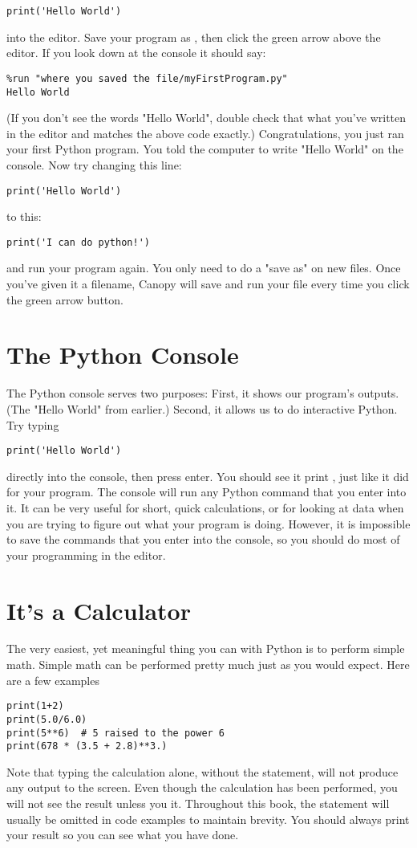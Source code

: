 \begin{Verbatim}
print('Hello World')
\end{Verbatim}

into the editor. Save your program as , then click the green
arrow above the editor. If you look down at the console it should say:

\begin{Verbatim}
%run "where you saved the file/myFirstProgram.py"
Hello World
\end{Verbatim}
(If you don't see the words "Hello World", double check that what you've written in the editor and matches the above code exactly.) Congratulations, you just ran your first Python program. You told the computer to write "Hello World" on the console.
Now try changing this line:
\begin{Verbatim}
print('Hello World')
\end{Verbatim}
to this:
\begin{Verbatim}
print('I can do python!')
\end{Verbatim}
and run your program again. You only need to do a "save as" on new files. Once you've given it a filename, Canopy will save and run your file every time you click the green arrow button.
\section{The Python Console}
The Python console serves two purposes: First, it shows our program's outputs. (The "Hello World" from earlier.) Second, it allows us to do interactive Python. Try typing
\begin{Verbatim}
print('Hello World')
\end{Verbatim}
directly into the console, then press enter.  You should see it print
, just like it did for your program. The console
will run any Python command that you enter into it. It can be very
useful for short, quick calculations, or for looking at data when you
are trying to figure out what your program is doing. However, it is
impossible to save the commands that you enter into the console, so
you should do most of your programming in the editor.


\section{It's a Calculator}
The very easiest, yet meaningful thing you can with Python is to
perform simple math. Simple math can be performed pretty much just as
you would expect. Here are a few examples
\begin{Verbatim}
print(1+2)
print(5.0/6.0)
print(5**6)  # 5 raised to the power 6
print(678 * (3.5 + 2.8)**3.)
\end{Verbatim}
Note that typing the calculation alone, without the 
statement, will not produce any output to the screen.  Even though the
calculation has been performed, you will not see the result unless you
 it. Throughout this book, the 
statement will usually be omitted in code examples to maintain
brevity.  You should always print your result so you can see what you
have done.
